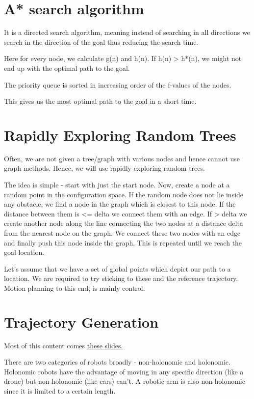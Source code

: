 \section{A* search algorithm}

It is a directed search algorithm, meaning instead of searching in all directions we search in the direction of the goal thus reducing the search time.

Here for every node, we calculate g(n) and h(n). If h(n) > h*(n), we might not end up with the optimal path to the goal.

The priority queue is sorted in increasing order of the f-values of the nodes.

This gives us the most optimal path to the goal in a short time.

\section{Rapidly Exploring Random Trees}

Often, we are not given a tree/graph with various nodes and hence cannot use graph methods. Hence, we will use rapidly exploring random trees. 

The idea is simple - start with just the start node. Now, create a node at a random point in the configuration space. If the random node does not lie inside any obstacle, we find a node in the graph which is closest to this node. If the distance between them is <= delta we connect them with an edge. If > delta we create another node along the line connecting the two nodes at a distance delta from the nearest node on the graph. We connect these two nodes with an edge and finally push this node inside the graph. This is repeated until we reach the goal location.

Let's assume that we have a set of global points which depict our path to a location. We are required to try sticking to these and the reference trajectory. Motion planning to this end, is mainly control. 

\section{Trajectory Generation}

Most of this content comes \href{https://raw.githubusercontent.com/RoboticsIIITH/summer-sessions-2020/master/lecture-slides/motion_planning/presentation.pdf}{these slides.}

There are two categories of robots broadly - non-holonomic and holonomic. Holonomic robots have the advantage of moving in any specific direction (like a drone) but non-holonomic (like cars) can't. A robotic arm is also non-holonomic since it is limited to a certain length.

